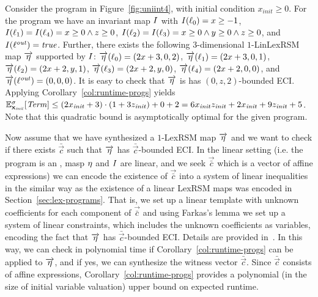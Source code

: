 \begin{example}
Consider the program in Figure~\ref{fig:uniint4}, with initial condition 
$x_{\mathit{init}}\geq 0$. For the program we have an 
invariant map $I$ with $I(\ell_0)=x\geq -1$, $I(\ell_1)=I(\ell_4) = 
x\geq 0 
\wedge z\geq 0$, $I(\ell_2)=I(\ell_3)= x\geq 0 \wedge y \geq 0
\wedge z\geq 0$, and $I(\ell^{\mathit{out}})=\mathit{true}$. Further, there exists 
the following 
$3$-dimensional 
$1$-LinLexRSM map $\overrightarrow{\eta}$ supported by $I$: 
$\overrightarrow{\eta}(\ell_0)=(2x+3,0,2)$, 
$\overrightarrow{\eta}(\ell_1)=(2x+3,0,1)$, 
$\overrightarrow{\eta}(\ell_2)=(2x+2,y,1)$, 
$\overrightarrow{\eta}(\ell_3)=(2x+2,y,0)$, 
$\overrightarrow{\eta}(\ell_4)=(2x+2,0,0)$, and 
$\overrightarrow{\eta}(\ell^{\mathit{out}})=(0,0,0)$. It is 
easy to check that $\overrightarrow{\eta}$ is has $(0,z,2)$-bounded ECI. 
Applying 
Corollary~\ref{col:runtime-progs} yields $\mathbb{E}^{\sigma}_{\mathbf{x}_{\mathit{init}}}[\mathit{Term}]\leq 
(2x_{\mathit{init}} + 
3)\cdot(1+3z_{\mathit{init}})+0+2= 6x_{\mathit{init}}z_{\mathit{init}} + 
2x_{\mathit{init}} + 9z_{\mathit{init}}+5$. Note that this quadratic bound is 
asymptotically optimal for the given program.
\end{example}

Now assume that we have synthesized a $1$-LexRSM map $\overrightarrow{\eta}$ 
and we want 
to check if there exists $\bar{\vec{c}}$ such that $\overrightarrow{\eta}$ has 
$\bar{\vec{c}}$-bounded ECI. In the linear setting (i.e. the program is an 
\APP{}, masp $\eta$ and $I$ are linear, and we seek $\vec{\bar{c}}$ which is 
a vector of affine expressions) we can encode the existence of $\vec{\bar{c}}$ 
into a system of linear inequalities in the similar way as the existence of a 
linear LexRSM maps was encoded in Section~\ref{sec:lex-programs}. That is, we 
set up a linear template with unknown coefficients for each component of 
$\vec{\bar{c}}$ and using Farkas's lemma we set up a system of linear 
constraints, which includes the unknown coefficients as variables, encoding the 
fact that $\overrightarrow{\eta}$ has $\bar{\vec{c}}$-bounded ECI. Details are 
provided 
in~\AppendixMaterial. In this way, we can check in polynomial time if 
Corollary~\ref{col:runtime-progs} can be applied to $\overrightarrow{\eta}$, 
and if yes, 
we can synthesize the witness vector $\bar{\vec{c}}$. Since $\bar{\vec{c}}$ 
consists of affine expressions, Corollary~\ref{col:runtime-progs} provides a 
polynomial (in the size of 
initial variable valuation) upper bound on expected runtime.


